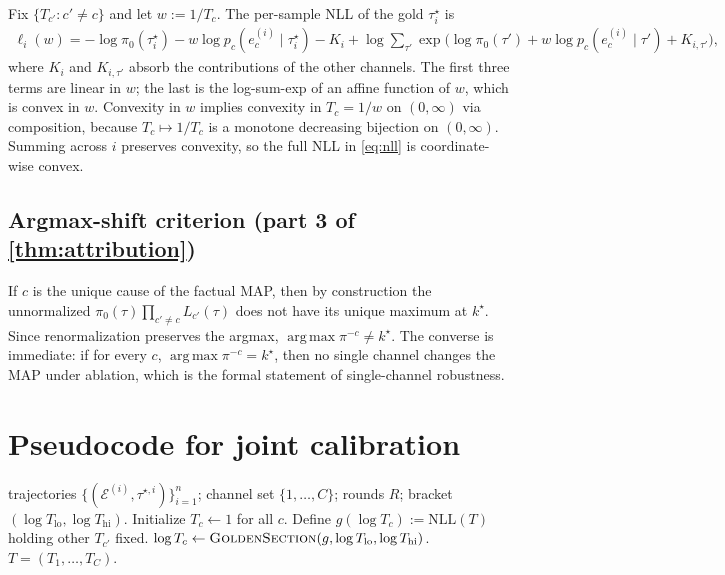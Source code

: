 \documentclass[11pt,a4paper]{article}
\newcommand{\Ecal}{\mathcal{E}}
\DeclareMathOperator*{\argmax}{arg\,max}
\theoremstyle{plain}
\theoremstyle{definition}
\theoremstyle{remark}
\begin{document}
Fix $\{T_{c'} : c' \neq c\}$ and let $w := 1/T_c$. The per-sample
NLL of the gold $\tau^\star_i$ is
\begin{align*}
\ell_i(w)
  = -\log \pi_0(\tau^\star_i)
    - w \log p_c(e^{(i)}_c \mid \tau^\star_i) - K_i
    + \log \!\sum_{\tau'} \exp\!\Big(
      \log \pi_0(\tau') + w \log p_c(e^{(i)}_c \mid \tau')
      + K_{i,\tau'} \Big),
\end{align*}
where $K_i$ and $K_{i,\tau'}$ absorb the contributions of the other
channels. The first three terms are linear in $w$; the last is the
log-sum-exp of an affine function of $w$, which is convex in $w$.
Convexity in $w$ implies convexity in $T_c = 1/w$ on $(0,\infty)$ via
composition, because $T_c \mapsto 1/T_c$ is a monotone decreasing
bijection on $(0,\infty)$. Summing across $i$ preserves convexity,
so the full NLL in \eqref{eq:nll} is coordinate-wise convex.

\subsection{Argmax-shift criterion (part 3 of
\cref{thm:attribution})}

If $c$ is the unique cause of the factual MAP, then by construction
the unnormalized $\pi_0(\tau) \prod_{c' \neq c} L_{c'}(\tau)$ does
not have its unique maximum at $k^\star$. Since renormalization
preserves the argmax, $\argmax \pi^{-c} \neq k^\star$. The converse
is immediate: if for every $c$, $\argmax \pi^{-c} = k^\star$, then
no single channel changes the MAP under ablation, which is the
formal statement of single-channel robustness.

\section{Pseudocode for joint calibration}
\label{app:fit-temperatures}

\begin{algorithm}[H]
\caption{Coordinate-wise golden-section fit of channel
temperatures.}
\label{alg:fit}
\begin{algorithmic}[1]
\Require trajectories $\{(\Ecal^{(i)}, \tau^{\star,i})\}_{i=1}^n$;
  channel set $\{1, \dots, C\}$; rounds $R$; bracket
  $(\log T_{\text{lo}}, \log T_{\text{hi}})$.
\State Initialize $T_c \leftarrow 1$ for all $c$.
    \State Define $g(\log T_c) := \text{NLL}(T)$ holding other
      $T_{c'}$ fixed.
    \State $\log T_c \leftarrow \textsc{GoldenSection}(g,
      \log T_{\text{lo}}, \log T_{\text{hi}})$.
  \EndFor
\EndFor
\State \Return $T = (T_1, \dots, T_C)$.
\end{algorithmic}
\end{algorithm}
\end{document}
